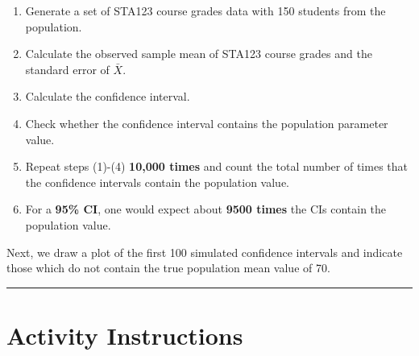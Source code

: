 \documentclass[oneside,openany]{book}
\providecommand{\tightlist}{%
  \setlength{\itemsep}{0pt}\setlength{\parskip}{0pt}}
\begin{document}
\begin{enumerate}
\def\labelenumi{\arabic{enumi}.}
\tightlist
\item
  Generate a set of STA123 course grades data with 150 students from the population.
\item
  Calculate the observed sample mean of STA123 course grades and the standard error of \(\bar{X}\).
\item
  Calculate the confidence interval.
\item
  Check whether the confidence interval contains the population parameter value.
\item
  Repeat steps (1)-(4) \textbf{10,000 times} and count the total number of times that the confidence intervals contain the population value.
\item
  For a \textbf{95\% CI}, one would expect about \textbf{9500 times} the CIs contain the population value.
\end{enumerate}

Next, we draw a plot of the first 100 simulated confidence intervals and indicate those which do not contain the true population mean value of 70.

\begin{center}\rule{0.5\linewidth}{0.5pt}\end{center}

\section{Activity Instructions}\label{activity-instructions}
\end{document}
